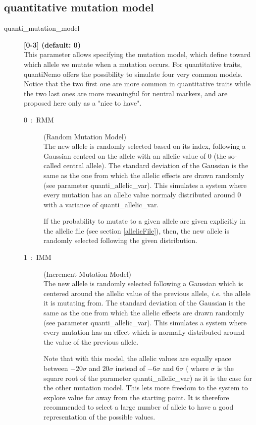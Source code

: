 \documentclass[letterpaper,12pt,oneside]{book}
\begin{document}
\subsection{quantitative mutation model}
\begin{description}
\item[quanti\_mutation\_model] \textbf{[0-3] (default: 0)}\\
This parameter allows specifying the mutation model, which define toward which allele we mutate when a mutation occurs. For quantitative traits, quantiNemo offers the possibility to simulate four very common models. Notice that the two first one are more common in quantitative traits while the two last ones are more meaningful for neutral markers, and are proposed here only as a "nice to have". 
\begin{description}

\item[0~:~RMM] (Random Mutation Model)\\
The new allele is randomly selected based on its index, following a Gaussian centred on the allele with an allelic value of 0 (the so-called central allele). The standard deviation of the Gaussian is the same as the one from which the allelic effects are drawn randomly (see parameter \textsf{quanti\_allelic\_var}). This simulates a system where every mutation has an allelic value normaly distributed around 0 with a variance of \textsf{quanti\_allelic\_var}.

If the probability to mutate to a given allele are given explicitly in the allelic file (see section \ref{allelicFile}), then, the new allele is randomly selected following the given distribution. 

\item[1~:~IMM] (Increment Mutation Model)\\
The new allele is randomly selected following a Gaussian which is centered around the allelic value of the previous allele, \textit{i.e.} the allele it is mutating from. The standard deviation of the Gaussian is the same as the one from which the allelic effects are drawn randomly (see parameter \textsf{quanti\_allelic\_var}). This simulates a system where every mutation has an effect which is normally distributed around the value of the previous allele.   

Note that with this model, the allelic values are equally space between $-20\sigma$ and $20\sigma$ instead of  $-6\sigma$ and $6\sigma$ ( where $\sigma$ is the square root of the parameter \textsf{quanti\_allelic\_var}) as it is the case for the other mutation model. This lets more freedom to the system to explore value far away from the starting point. It is therefore recommended to select a large number of allele to have a good representation of the possible values. 


\end{description}
\end{description}
\end{document}
